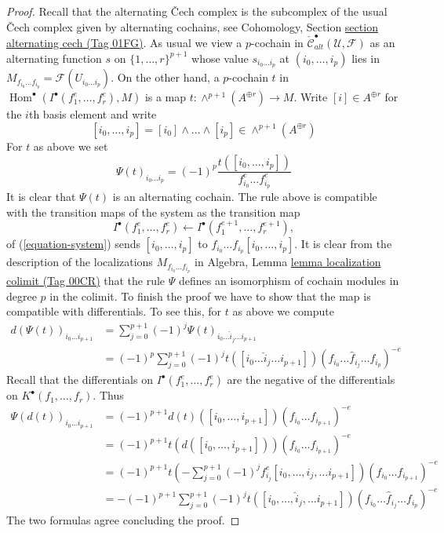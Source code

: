 \documentclass{amsart}
\theoremstyle{plain}
\theoremstyle{definition}
\theoremstyle{remark}
\numberwithin{equation}{subsection}
\def\Hom{\mathop{\mathrm{Hom}}\nolimits}
\begin{document}
\begin{proof}
Recall that the alternating {\v C}ech complex is the subcomplex
of the usual {\v C}ech complex given by alternating cochains, see
Cohomology, Section \href{https://stacks.math.columbia.edu/tag/01FG}{section alternating cech (Tag 01FG)}.
As usual we view a $p$-cochain in
$\check{\mathcal{C}}_{alt}^\bullet(\mathcal{U}, \mathcal{F})$
as an alternating function $s$ on $\{1, \ldots, r\}^{p + 1}$
whose value $s_{i_0\ldots i_p}$ at $(i_0, \ldots, i_p)$ lies in
$M_{f_{i_0}\ldots f_{i_p}} = \mathcal{F}(U_{i_0\ldots i_p})$.
On the other hand, a $p$-cochain $t$ in
$\Hom^\bullet(I^\bullet(f_1^e, \ldots, f_r^e), M)$
is a map $t : \wedge^{p + 1}(A^{\oplus r}) \to M$.
Write $[i] \in A^{\oplus r}$ for the $i$th basis element and
write
$$
[i_0, \ldots, i_p] = [i_0] \wedge \ldots \wedge [i_p]
\in \wedge^{p + 1}(A^{\oplus r})
$$
For $t$ as above we set
$$
\Psi(t)_{i_0 \ldots i_p} =
(-1)^p \frac{t([i_0, \ldots, i_p])}{f_{i_0}^e\ldots f_{i_p}^e}
$$
It is clear that $\Psi(t)$ is an alternating cochain.
The rule above is compatible with the transition maps
of the system as the transition map
$$
I^\bullet(f_1^e, \ldots, f_r^e) \leftarrow
I^\bullet(f_1^{e + 1}, \ldots, f_r^{e + 1}),
$$
of (\ref{equation-system}) sends $[i_0, \ldots, i_p]$
to $f_{i_0}\ldots f_{i_p}[i_0, \ldots, i_p]$.
It is clear from the description of the localizations
$M_{f_{i_0} \ldots f_{i_p}}$ in
Algebra, Lemma \href{https://stacks.math.columbia.edu/tag/00CR}{lemma localization colimit (Tag 00CR)}
that the rule $\Psi$ defines an isomorphism of cochain modules
in degree $p$ in the colimit. To finish the proof we have to show that the map
is compatible with differentials. To see this, for $t$ as above we compute
\begin{align*}
d(\Psi(t))_{i_0 \ldots i_{p + 1}}
& =
\sum\nolimits_{j = 0}^{p + 1} (-1)^j
\Psi(t)_{i_0\ldots \hat i_j \ldots i_{p + 1}} \\
& =
(-1)^p
\sum\nolimits_{j = 0}^{p + 1} (-1)^j t([i_0 \ldots \hat i_j \ldots i_{p + 1}])
(f_{i_0} \ldots \hat f_{i_j} \ldots f_{i_p})^{-e}
\end{align*}
Recall that the differentials on $I^\bullet(f_1^e, \ldots, f_r^e)$
are the negative of the differentials on $K^\bullet(f_1, \ldots, f_r)$.
Thus
\begin{align*}
\Psi(d(t))_{i_0 \ldots i_{p + 1}} & =
(-1)^{p + 1}
d(t)([i_0, \ldots, i_{p + 1}]) (f_{i_0} \ldots f_{i_{p + 1}})^{-e} \\
& =
(-1)^{p + 1}
t(d([i_0, \ldots, i_{p + 1}])) (f_{i_0} \ldots f_{i_{p + 1}})^{-e} \\
& =
(-1)^{p + 1}
t(-\sum\nolimits_{j = 0}^{p + 1}
(-1)^j f_{i_j}^e [i_0, \ldots, \hat i_j, \ldots i_{p + 1}])
(f_{i_0} \ldots f_{i_{p + 1}})^{-e} \\
& =
-(-1)^{p + 1}
\sum\nolimits_{j = 0}^{p + 1}
(-1)^j t([i_0, \ldots, \hat i_j, \ldots i_{p + 1}])
(f_{i_0} \ldots \hat f_{i_j} \ldots f_{i_p})^{-e}
\end{align*}
The two formulas agree concluding the proof.
\end{proof}
\end{document}
